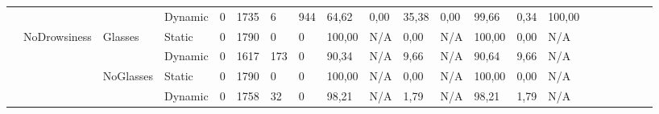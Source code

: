 \documentclass[12pt]{article}
\begin{document}
\begin{landscape}
\begin{table}[]
\begin{adjustbox}{width=1.4\textwidth}
\begin{tabular}{lllllllllllllllccllll}
				\multicolumn{1}{|l|}{} & \multicolumn{1}{l|}{} & \multicolumn{1}{l|}{} & \multicolumn{1}{l|}{Dynamic} & \multicolumn{1}{l|}{0} & \multicolumn{1}{l|}{1735} & \multicolumn{1}{l|}{6} & \multicolumn{1}{l|}{944} & \multicolumn{1}{l|}{64,62} & \multicolumn{1}{l|}{0,00} & \multicolumn{1}{l|}{35,38} & \multicolumn{1}{l|}{0,00} & \multicolumn{1}{l|}{99,66} & \multicolumn{1}{l|}{0,34} & \multicolumn{1}{l|}{100,00} & \multicolumn{1}{c|}{} & \multicolumn{1}{c|}{} & \multicolumn{1}{l|}{} & \multicolumn{1}{l|}{} & \multicolumn{1}{l|}{} & \multicolumn{1}{l|}{} \\ \cline{2-15}
				\multicolumn{1}{|l|}{} & \multicolumn{1}{l|}{\multirow{4}{*}{NoDrowsiness}} & \multicolumn{1}{l|}{\multirow{2}{*}{Glasses}} & \multicolumn{1}{l|}{Static} & \multicolumn{1}{l|}{0} & \multicolumn{1}{l|}{1790} & \multicolumn{1}{l|}{0} & \multicolumn{1}{l|}{0} & \multicolumn{1}{l|}{100,00} & \multicolumn{1}{l|}{N/A} & \multicolumn{1}{l|}{0,00} & \multicolumn{1}{l|}{N/A} & \multicolumn{1}{l|}{100,00} & \multicolumn{1}{l|}{0,00} & \multicolumn{1}{l|}{N/A} & \multicolumn{1}{c|}{} & \multicolumn{1}{c|}{} & \multicolumn{1}{l|}{} & \multicolumn{1}{l|}{} & \multicolumn{1}{l|}{} & \multicolumn{1}{l|}{} \\ \cline{4-15}
				\multicolumn{1}{|l|}{} & \multicolumn{1}{l|}{} & \multicolumn{1}{l|}{} & \multicolumn{1}{l|}{Dynamic} & \multicolumn{1}{l|}{0} & \multicolumn{1}{l|}{1617} & \multicolumn{1}{l|}{173} & \multicolumn{1}{l|}{0} & \multicolumn{1}{l|}{90,34} & \multicolumn{1}{l|}{N/A} & \multicolumn{1}{l|}{9,66} & \multicolumn{1}{l|}{N/A} & \multicolumn{1}{l|}{90,64} & \multicolumn{1}{l|}{9,66} & \multicolumn{1}{l|}{N/A} & \multicolumn{1}{c|}{} & \multicolumn{1}{c|}{} & \multicolumn{1}{l|}{} & \multicolumn{1}{l|}{} & \multicolumn{1}{l|}{} & \multicolumn{1}{l|}{} \\ \cline{3-15}
				\multicolumn{1}{|l|}{} & \multicolumn{1}{l|}{} & \multicolumn{1}{l|}{\multirow{2}{*}{NoGlasses}} & \multicolumn{1}{l|}{Static}  & \multicolumn{1}{l|}{0} & \multicolumn{1}{l|}{1790} & \multicolumn{1}{l|}{0} & \multicolumn{1}{l|}{0} & \multicolumn{1}{l|}{100,00} & \multicolumn{1}{l|}{N/A} & \multicolumn{1}{l|}{0,00} & \multicolumn{1}{l|}{N/A} & \multicolumn{1}{l|}{100,00} & \multicolumn{1}{l|}{0,00} & \multicolumn{1}{l|}{N/A} & \multicolumn{1}{c|}{} & \multicolumn{1}{c|}{} & \multicolumn{1}{l|}{} & \multicolumn{1}{l|}{} & \multicolumn{1}{l|}{} & \multicolumn{1}{l|}{} \\ \cline{4-15}
				\multicolumn{1}{|l|}{} & \multicolumn{1}{l|}{} & \multicolumn{1}{l|}{} & \multicolumn{1}{l|}{Dynamic} & \multicolumn{1}{l|}{0} & \multicolumn{1}{l|}{1758} & \multicolumn{1}{l|}{32} & \multicolumn{1}{l|}{0} & \multicolumn{1}{l|}{98,21} & \multicolumn{1}{l|}{N/A} & \multicolumn{1}{l|}{1,79} & \multicolumn{1}{l|}{N/A} & \multicolumn{1}{l|}{98,21} & \multicolumn{1}{l|}{1,79} & \multicolumn{1}{l|}{N/A} & \multicolumn{1}{c|}{} & \multicolumn{1}{c|}{} & \multicolumn{1}{l|}{} & \multicolumn{1}{l|}{} & \multicolumn{1}{l|}{} & \multicolumn{1}{l|}{} \\ \hline

\end{tabular}
\end{adjustbox}
\end{table}
\end{landscape}
\end{document}
